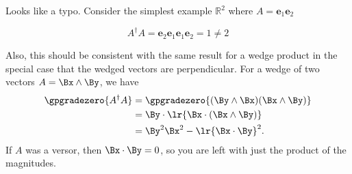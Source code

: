 


Looks like a typo.  Consider the simplest example $\mathbb{R}^2$ where $A = \mathbf{e}_1 \mathbf{e}_2$

$$A^\dagger A = \mathbf{e}_2 \mathbf{e}_1 \mathbf{e}_1 \mathbf{e}_2 = 1 \ne 2$$

Also, this should be consistent with the same result for a wedge product in the special case that the wedged vectors are perpendicular.  For a wedge of two vectors $A = \Bx \wedge \By$, we have
\begin{equation}\label{eqn:xtox:80}
\begin{aligned}
\gpgradezero{A^\dagger A}
&= \gpgradezero{(\By \wedge \Bx)(\Bx \wedge \By)} \\
&= \By \cdot \lr{ \Bx \cdot (\Bx \wedge \By)} \\
&= \By^2 \Bx^2 - \lr{\Bx \cdot \By}^2.
\end{aligned}
\end{equation}
If $A$ was a versor, then \(\Bx \cdot \By = 0\), so you are left with just the product of the magnitudes.


